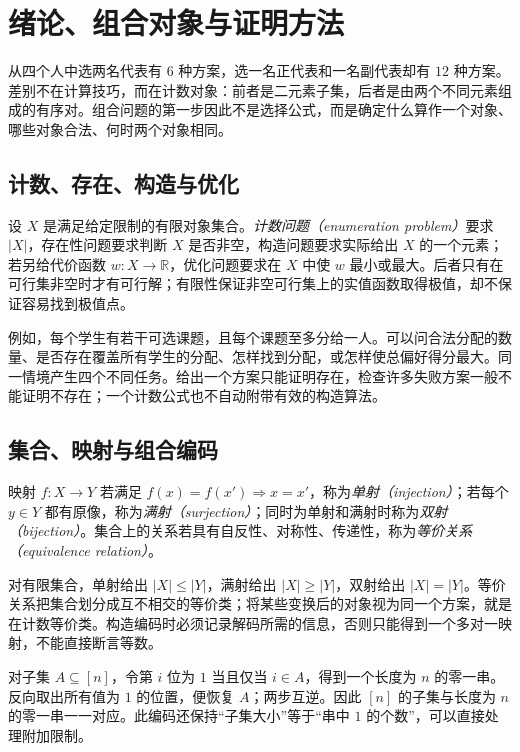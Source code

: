 \setcounter{chapter}{0} %
\chapter{绪论、组合对象与证明方法}
\label{ch:objects}

从四个人中选两名代表有 $6$ 种方案，选一名正代表和一名副代表却有 $12$ 种方案。差别不在计算技巧，而在计数对象：前者是二元素子集，后者是由两个不同元素组成的有序对。组合问题的第一步因此不是选择公式，而是确定什么算作一个对象、哪些对象合法、何时两个对象相同。

\section{计数、存在、构造与优化}

设 $X$ 是满足给定限制的有限对象集合。\emph{计数问题（enumeration problem）}要求 $|X|$，存在性问题要求判断 $X$ 是否非空，构造问题要求实际给出 $X$ 的一个元素；若另给代价函数 $w:X\to\mathbb R$，优化问题要求在 $X$ 中使 $w$ 最小或最大。后者只有在可行集非空时才有可行解；有限性保证非空可行集上的实值函数取得极值，却不保证容易找到极值点。

例如，每个学生有若干可选课题，且每个课题至多分给一人。可以问合法分配的数量、是否存在覆盖所有学生的分配、怎样找到分配，或怎样使总偏好得分最大。同一情境产生四个不同任务。给出一个方案只能证明存在，检查许多失败方案一般不能证明不存在；一个计数公式也不自动附带有效的构造算法。

\section{集合、映射与组合编码}

\begin{definition}
映射 $f:X\to Y$ 若满足 $f(x)=f(x')\Rightarrow x=x'$，称为\emph{单射（injection）}；若每个 $y\in Y$ 都有原像，称为\emph{满射（surjection）}；同时为单射和满射时称为\emph{双射（bijection）}。集合上的关系若具有自反性、对称性、传递性，称为\emph{等价关系（equivalence relation）}。
\end{definition}

对有限集合，单射给出 $|X|\le|Y|$，满射给出 $|X|\ge|Y|$，双射给出 $|X|=|Y|$。等价关系把集合划分成互不相交的等价类；将某些变换后的对象视为同一个方案，就是在计数等价类。构造编码时必须记录解码所需的信息，否则只能得到一个多对一映射，不能直接断言等数。

\begin{example}[子集与零一串]
对子集 $A\subseteq[n]$，令第 $i$ 位为 $1$ 当且仅当 $i\in A$，得到一个长度为 $n$ 的零一串。反向取出所有值为 $1$ 的位置，便恢复 $A$；两步互逆。因此 $[n]$ 的子集与长度为 $n$ 的零一串一一对应。此编码还保持“子集大小”等于“串中 $1$ 的个数”，可以直接处理附加限制。
\end{example}

